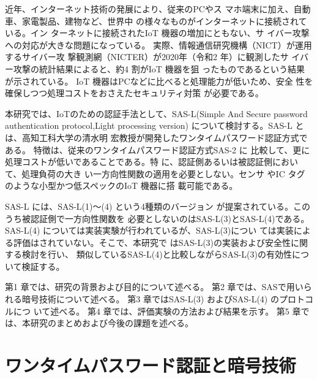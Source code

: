 \documentclass{thesis}
\begin{document}
近年、インターネット技術の発展により、従来のPCやス
マホ端末に加え、自動車、家電製品、建物など、世界中
の様々なものがインターネットに接続されている。イン
ターネットに接続されたIoT 機器の増加にともない、サ
イバー攻撃への対応が大きな問題になっている。
実際、情報通信研究機構（NICT）が運用するサイバー攻
撃観測網（NICTER）が2020年（令和2 年）に観測したサ
イバー攻撃の統計結果\cite{サイバー攻撃の最近の動向等について}によると、約4 割がIoT 機器を狙
ったものであるという結果が示されている。
IoT 機器はPCなどに比べると処理能力が低いため、安全
性を確保しつつ処理コストをおさえたセキュリティ対策
が必要である。

本研究では、IoTのための認証手法として、SAS-L(Simple 
And Secure password
authentication protocol,Light processing version)\cite{SAS-Lワンタイムパスワード認証方式について}
について検討する。SAS-L とは、高知工科大学の清水明
宏教授が開発したワンタイムパスワード認証方式である。
特徴は、従来のワンタイムパスワード認証方式SAS-2 に
比較して、更に処理コストが低いであることである。特
に、認証側あるいは被認証側において、処理負荷の大き
い一方向性関数の適用を必要としない。センサ
やIC タグのような小型かつ低スペックのIoT 機器に搭
載可能である。

SAS-L には、SAS-L(1)～(4) という4種類のバージョン
が提案されている。このうち被認証側で一方向性関数を
必要としないのはSAS-L(3)とSAS-L(4)である。SAS-L(4)
については実装実験が行われているが、SAS-L(3)につい
ては実装による評価はされていない。そこで、本研究で
はSAS-L(3)の実装および安全性に関する検討を行い、
類似しているSAS-L(4)と比較しながらSAS-L(3)の有効性について検証する。

第1 章では、研究の背景および目的について述べる。
第2 章では、SASで用いられる暗号技術について述べる。
第3 章ではSAS-L(3) およびSAS-L(4) のプロトコルにつ
いて述べる。
第4 章では、評価実験の方法および結果を示す。
第5 章では、本研究のまとめおよび今後の課題を述べる。

\chapter{ワンタイムパスワード認証と暗号技術}
\end{document}
